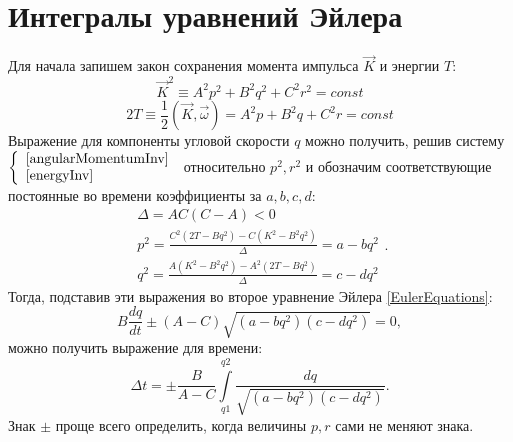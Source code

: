 \documentclass{article}
\begin{document}
\section{Интегралы уравнений Эйлера}
Для начала запишем закон сохранения момента импульса \begin{math} \vec{K} \end{math} и энергии \begin{math} T \end{math}:
\begin{equation}
\label{angularMomentumInv}
\vec{K}^2\equiv A^2p^2+B^2q^2+C^2r^2=const
\end{equation}
\begin{equation}
\label{energyInv}
2T\equiv\frac{1}{2}\left(\vec{K},\vec{\omega}\right)=A^2p+B^2q+C^2r=const
\end{equation}
Выражение для компоненты угловой скорости \begin{math} q \end{math} можно получить, решив систему
\begin{math}
\left\{
\begin{array}{l}
\ref{angularMomentumInv}\\
\ref{energyInv}
\end{array}
\right.
\end{math}
относительно \begin{math} p^2, r^2\end{math} и обозначим соответствующие постоянные во времени коэффициенты за \begin{math} a, b, c, d \end{math}:
\begin{equation}
\begin{array}{l}
\Delta=AC(C-A)<0\\
p^2=\frac{C^2(2T-Bq^2)-C(K^2-B^2q^2)}{\Delta}=a-bq^2\\
q^2=\frac{A(K^2-B^2q^2)-A^2(2T-Bq^2)}{\Delta}=c-dq^2
\end{array}.
\end{equation}
Тогда, подставив эти выражения во второе уравнение Эйлера \ref{EulerEquations}:
\begin{equation}
B\frac{dq}{dt}\pm(A-C)\sqrt{(a-bq^2)(c-dq^2)}=0,
\end{equation}
можно получить выражение для времени:
\begin{equation}
\Delta t=\pm\frac{B}{A-C}{\int\limits_{q1}^{q2}\frac{dq}{\sqrt{(a-bq^2)(c-dq^2)}}}.
\end{equation}
Знак \begin{math} \pm \end{math} проще всего определить, когда величины \begin{math} p, r \end{math} сами не меняют знака.
% 
%
\end{document}
